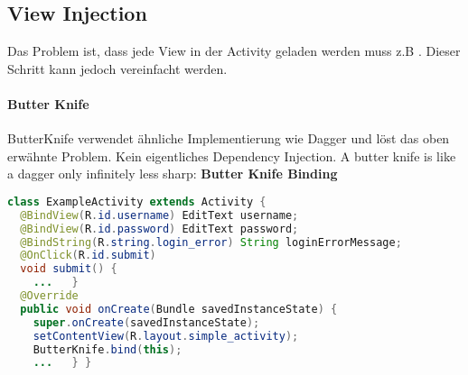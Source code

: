 \subsection{View Injection}
Das Problem ist, dass jede View in der Activity geladen werden muss z.B . Dieser Schritt kann jedoch vereinfacht werden.
\paragraph{Butter Knife}
ButterKnife verwendet ähnliche Implementierung wie Dagger und löst das oben erwähnte Problem.
Kein eigentliches Dependency Injection. A butter knife is like a dagger only infinitely less sharp:
\textbf{Butter Knife Binding}
\begin{lstlisting}[language=java]
class ExampleActivity extends Activity {
  @BindView(R.id.username) EditText username;
  @BindView(R.id.password) EditText password;
  @BindString(R.string.login_error) String loginErrorMessage;
  @OnClick(R.id.submit) 
  void submit() {
    ...   }
  @Override 
  public void onCreate(Bundle savedInstanceState) {
    super.onCreate(savedInstanceState);
    setContentView(R.layout.simple_activity);
    ButterKnife.bind(this);
    ...   } } 
\end{lstlisting}

